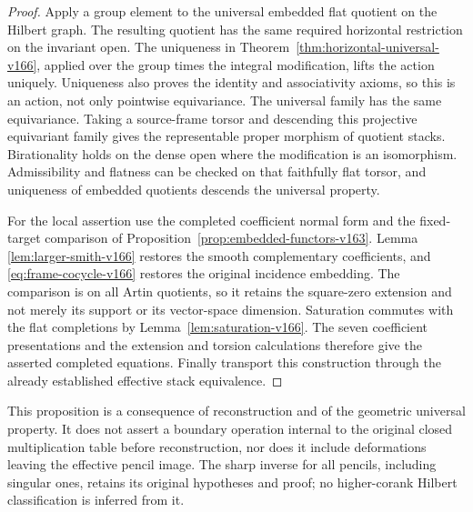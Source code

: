 \begin{proof}
Apply a group element to the universal embedded flat quotient on
the Hilbert graph. The resulting quotient has the same required
horizontal restriction on the invariant open. The uniqueness in
Theorem~\ref{thm:horizontal-universal-v166}, applied over the group
times the integral modification, lifts the action uniquely.
Uniqueness also proves the identity and associativity axioms, so
this is an action, not only pointwise equivariance. The universal
family has the same equivariance. Taking a source-frame torsor
and descending this projective equivariant family gives the
representable proper morphism of quotient stacks. Birationality
holds on the dense open where the modification is an isomorphism.
Admissibility and flatness can be checked on that faithfully flat
torsor, and uniqueness of embedded quotients descends the universal
property.

For the local assertion use the completed coefficient normal form
and the fixed-target comparison of
Proposition~\ref{prop:embedded-functors-v163}. Lemma
\ref{lem:larger-smith-v166} restores the smooth complementary
coefficients, and \eqref{eq:frame-cocycle-v166} restores the
original incidence embedding. The comparison is on all Artin
quotients, so it retains the square-zero extension and not merely
its support or its vector-space dimension. Saturation commutes
with the flat completions by Lemma~\ref{lem:saturation-v166}.
The seven coefficient presentations and the extension and torsion
calculations therefore give the asserted completed equations.
Finally transport this construction through the already established
effective stack equivalence.
\end{proof}

This proposition is a consequence of reconstruction and of the
geometric universal property. It does not assert a boundary
operation internal to the original closed multiplication table
before reconstruction, nor does it include deformations leaving
the effective pencil image. The sharp inverse for all pencils,
including singular ones, retains its original hypotheses and proof;
no higher-corank Hilbert classification is inferred from it.

